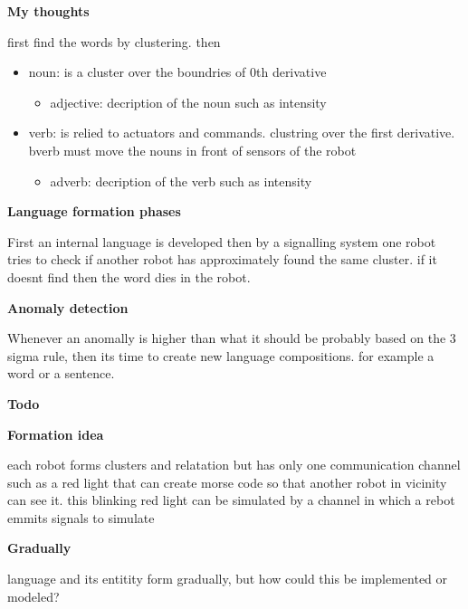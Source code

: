 \documentclass{book}
\providecommand{\ProjectDeepHeading}[2]{%
    \par\medskip\noindent\textbf{#2}\par\smallskip
}
\begin{document}
\ProjectDeepHeading{3}{My thoughts}
first find the words by clustering. then
\begin{itemize}
    \item noun: is a cluster over the boundries of 0th derivative
        \begin{itemize}
            \item adjective: decription of the noun such as intensity
        \end{itemize}
    \item verb: is relied to actuators and commands. clustring over the first derivative. bverb must move the nouns in front of sensors of the robot
        \begin{itemize}
            \item adverb: decription of the verb such as intensity
        \end{itemize}
\end{itemize}

\ProjectDeepHeading{6}{Language formation phases}
First an internal language is developed then by a signalling system one robot tries to check if another robot has approximately found the same cluster. if it doesnt find then the word dies in the robot.

\ProjectDeepHeading{3}{Anomaly detection}
Whenever an anomally is higher than what it should be probably based on the 3 sigma rule, then its time to create new language compositions. for example a word or a sentence.


\ProjectDeepHeading{3}{Todo}
    \ProjectDeepHeading{6}{Formation idea}
        each robot  forms clusters and relatation but has only one communication channel such as a red light that can create morse code so that another robot in vicinity can see it. this blinking red light can be simulated by a channel in which a rebot emmits signals to simulate
    
    \ProjectDeepHeading{6}{Gradually}
        language and its entitity form gradually, but how could this be implemented or modeled?
\end{document}
